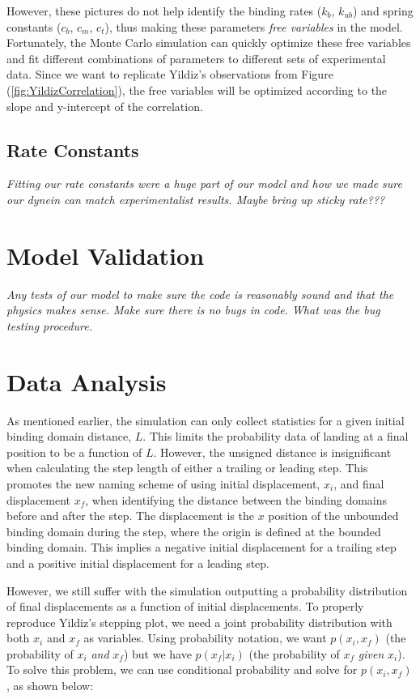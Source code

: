 However, these pictures do not help identify the binding rates ($k_b$, $k_{ub}$) and spring constants ($c_b$, $c_m$, $c_t$), thus making these parameters \textit{free variables} in the model. Fortunately, the Monte Carlo simulation can quickly optimize these free variables and fit different combinations of parameters to  different sets of experimental data. Since we want to replicate Yildiz's observations from Figure (\ref{fig:YildizCorrelation}), the free variables will be optimized according to the slope and y-intercept of the correlation. 

\subsection{Rate Constants}
\textit{Fitting our rate constants were a huge part of our model and how we made sure our dynein can match experimentalist results. Maybe bring up sticky rate???}

\section{Model Validation}
\textit{Any tests of our model to make sure the code is reasonably sound and that the physics makes sense. Make sure there is no bugs in code. What was the bug testing procedure.}

\section{Data Analysis} \label{sec:DataAna}
As mentioned earlier, the simulation can only collect statistics for a given initial binding domain distance, $L$. This limits the probability data of landing at a final position to be a function of $L$. However, the unsigned distance is insignificant when calculating the step length of either a trailing or leading step. This promotes the new naming scheme of using initial displacement, $x_i$, and final displacement $x_f$, when identifying the distance between the binding domains before and after the step. The displacement is the $x$ position of the unbounded binding domain during the step, where the origin is defined at the bounded binding domain. This implies a negative initial displacement for a trailing step and a positive initial displacement for a leading step. 

However, we still suffer with the simulation outputting a probability distribution of final displacements as a function of initial displacements. To properly reproduce Yildiz's stepping plot, we need a joint probability distribution with both $x_i$ and $x_f$ as variables. Using probability notation, we want $p(x_i,x_f)$ (the probability of $x_i$ \textit{and} $x_f$) but we have $p(x_f|x_i)$ (the probability of $x_f$ \textit{given} $x_i$). To solve this problem, we can use conditional probability and solve for $p(x_i,x_f)$, as shown below:


